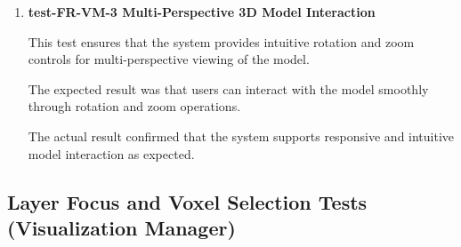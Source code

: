 \documentclass[12pt, titlepage]{article}
\begin{document}
\begin{enumerate}
The actual result confirmed that partitions were successfully retrieved, displayed, and that selection between partitions functioned as expected.



\item \textbf{test-FR-VM-3 Multi-Perspective 3D Model Interaction}

\hspace{1.5em} This test ensures that the system provides intuitive rotation and zoom controls for multi-perspective viewing of the model.

The expected result was that users can interact with the model smoothly through rotation and zoom operations.

The actual result confirmed that the system supports responsive and intuitive model interaction as expected.

\end{enumerate}

\subsection{Layer Focus and Voxel Selection Tests (Visualization Manager)}
\end{document}
